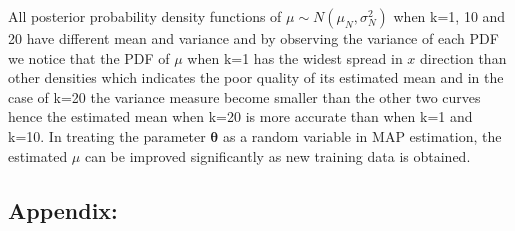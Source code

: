 \documentclass[a4paper]{article}
\begin{document}
All posterior probability density functions of $\mu \sim N(\mu_{N}, \sigma^{2}_{N})$ when k=1, 10 and 20 have different mean and variance and by observing the variance of each PDF we notice that the PDF of $\mu$ when k=1 has the widest spread in $x$ direction than other densities which indicates the poor quality of its estimated mean and in the case of k=20 the variance measure become smaller than the other two curves hence the estimated mean when k=20 is more accurate than when k=1 and k=10. In treating the parameter $\boldsymbol{\theta}$ as a random variable in MAP estimation, the estimated $\mu$ can be improved significantly as new training data is obtained.

\newpage
\subsection*{Appendix:}






\end{document}

